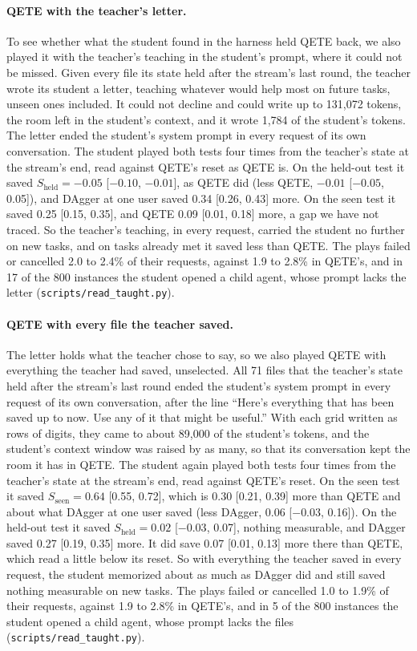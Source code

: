 \paragraph{QETE with the teacher's letter.}
\label{app:persist-letter}
To see whether what the student found in the harness held QETE back, we also played it with the teacher's teaching in the student's prompt, where it could not be missed. Given every file its state held after the stream's last round, the teacher wrote its student a letter, teaching whatever would help most on future tasks, unseen ones included. It could not decline and could write up to 131,072 tokens, the room left in the student's context, and it wrote 1,784 of the student's tokens. The letter ended the student's system prompt in every request of its own conversation. The student played both tests four times from the teacher's state at the stream's end, read against QETE's reset as QETE is. On the held-out test it saved $S_{\mathrm{held}} = -0.05$ [$-0.10$, $-0.01$], as QETE did (less QETE, $-0.01$ [$-0.05$, 0.05]), and DAgger at one user saved 0.34 [0.26, 0.43] more. On the seen test it saved 0.25 [0.15, 0.35], and QETE 0.09 [0.01, 0.18] more, a gap we have not traced. So the teacher's teaching, in every request, carried the student no further on new tasks, and on tasks already met it saved less than QETE. The plays failed or cancelled 2.0 to 2.4\% of their requests, against 1.9 to 2.8\% in QETE's, and in 17 of the 800 instances the student opened a child agent, whose prompt lacks the letter (\texttt{scripts/read\_taught.py}).

\paragraph{QETE with every file the teacher saved.}
\label{app:persist-dump}
The letter holds what the teacher chose to say, so we also played QETE with everything the teacher had saved, unselected. All 71 files that the teacher's state held after the stream's last round ended the student's system prompt in every request of its own conversation, after the line ``Here's everything that has been saved up to now. Use any of it that might be useful.'' With each grid written as rows of digits, they came to about 89,000 of the student's tokens, and the student's context window was raised by as many, so that its conversation kept the room it has in QETE. The student again played both tests four times from the teacher's state at the stream's end, read against QETE's reset. On the seen test it saved $S_{\mathrm{seen}} = 0.64$ [0.55, 0.72], which is 0.30 [0.21, 0.39] more than QETE and about what DAgger at one user saved (less DAgger, 0.06 [$-0.03$, 0.16]). On the held-out test it saved $S_{\mathrm{held}} = 0.02$ [$-0.03$, 0.07], nothing measurable, and DAgger saved 0.27 [0.19, 0.35] more. It did save 0.07 [0.01, 0.13] more there than QETE, which read a little below its reset. So with everything the teacher saved in every request, the student memorized about as much as DAgger did and still saved nothing measurable on new tasks. The plays failed or cancelled 1.0 to 1.9\% of their requests, against 1.9 to 2.8\% in QETE's, and in 5 of the 800 instances the student opened a child agent, whose prompt lacks the files (\texttt{scripts/read\_taught.py}).
